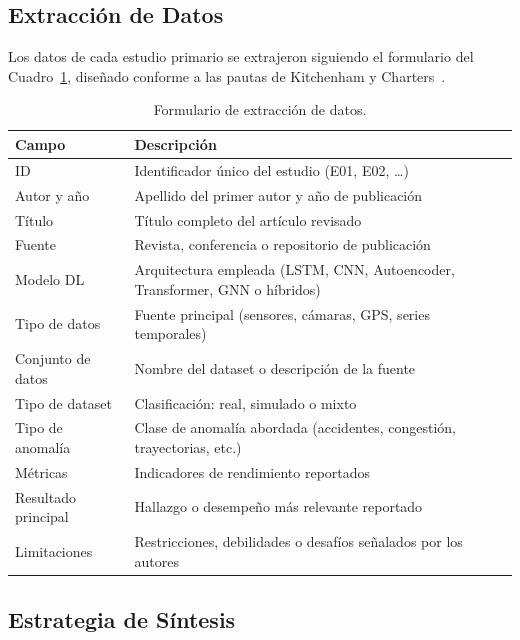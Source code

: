 \documentclass[12pt, a4paper]{article}
\begin{document}
\subsection{Extracci\'{o}n de Datos}

Los datos de cada estudio primario se extrajeron siguiendo el formulario del Cuadro~\ref{tab:extraccion}, dise\~{n}ado conforme a las pautas de Kitchenham y Charters~\cite{Kitchenham2007}.

\begin{table}[H]
\centering
\caption{Formulario de extracci\'{o}n de datos.}
\label{tab:extraccion}
\begin{tabularx}{\linewidth}{lX}
\toprule
\textbf{Campo} & \textbf{Descripci\'{o}n} \\
\midrule
ID                   & Identificador \'{u}nico del estudio (E01, E02, \ldots) \\
Autor y a\~{n}o      & Apellido del primer autor y a\~{n}o de publicaci\'{o}n \\
T\'{i}tulo           & T\'{i}tulo completo del art\'{i}culo revisado \\
Fuente               & Revista, conferencia o repositorio de publicaci\'{o}n \\
Modelo DL            & Arquitectura empleada (LSTM, CNN, Autoencoder, Transformer, GNN o h\'{i}bridos) \\
Tipo de datos        & Fuente principal (sensores, c\'{a}maras, GPS, series temporales) \\
Conjunto de datos    & Nombre del dataset o descripci\'{o}n de la fuente \\
Tipo de dataset      & Clasificaci\'{o}n: real, simulado o mixto \\
Tipo de anomal\'{i}a & Clase de anomal\'{i}a abordada (accidentes, congesti\'{o}n, trayectorias, etc.) \\
M\'{e}tricas         & Indicadores de rendimiento reportados \\
Resultado principal  & Hallazgo o desempe\~{n}o m\'{a}s relevante reportado \\
Limitaciones         & Restricciones, debilidades o desaf\'{i}os se\~{n}alados por los autores \\
\bottomrule
\end{tabularx}
\end{table}

\subsection{Estrategia de S\'{i}ntesis}
\end{document}
